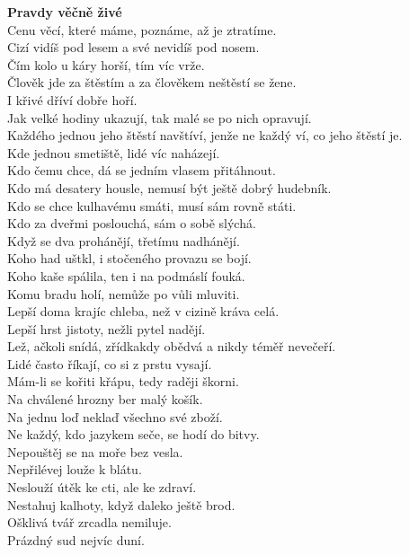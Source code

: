 \begin{multicols}{2}
\noindent
{\large\bf Pravdy věčně živé}\\[1 mm]
Cenu věcí, které máme, poznáme, až je ztratíme.\\
Cizí vidíš pod lesem a své nevidíš pod nosem.\\
Čím kolo u káry horší, tím víc vrže.\\
Člověk jde za štěstím a za člověkem neštěstí se žene.\\
I křivé dříví dobře hoří.\\
Jak velké hodiny ukazují, tak malé se po nich opravují.\\
Každého jednou jeho štěstí navštíví, jenže ne každý ví, co jeho 
štěstí je.\\
Kde jednou smetiště, lidé víc naházejí.\\
Kdo čemu chce, dá se jedním vlasem přitáhnout.\\
Kdo má desatery housle, nemusí být ještě dobrý hudebník.\\
Kdo se chce kulhavému smáti, musí sám rovně státi.\\
Kdo za dveřmi poslouchá, sám o sobě slýchá.\\
Když se dva prohánějí, třetímu nadhánějí.\\
Koho had uštkl, i stočeného provazu se bojí.\\
Koho kaše spálila, ten i na podmáslí fouká.\\
Komu bradu holí, nemůže po vůli mluviti.\\
Lepší doma krajíc chleba, než v cizině kráva celá.\\
Lepší hrst jistoty, nežli pytel nadějí.\\
Lež, ačkoli snídá, zřídkakdy obědvá a nikdy téměř nevečeří.\\
Lidé často říkají, co si z prstu vysají.\\
Mám-li se kořiti křápu, tedy raději škorni.\\
Na chválené hrozny ber malý košík.\\
Na jednu loď neklaď všechno své zboží.\\
Ne každý, kdo jazykem seče, se hodí do bitvy.\\
Nepouštěj se na moře bez vesla.\\
Nepřilévej louže k blátu.\\
Neslouží útěk ke cti, ale ke zdraví.\\
Nestahuj kalhoty, když daleko ještě brod.\\
Ošklivá tvář zrcadla nemiluje.\\
Prázdný sud nejvíc duní.\\

\end{multicols}
